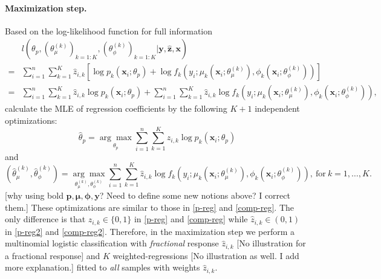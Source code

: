 \documentclass[11pt]{article}
\numberwithin{equation}{section}
\def\bx{\boldsymbol{x}}
\def\by{\boldsymbol{y}}
\def\bp{\boldsymbol{p}}
\def\bmu{\boldsymbol{\mu}}
\def\bphi{\boldsymbol{\phi}}
\def\bz{\boldsymbol{z}}
\begin{document}
\paragraph{Maximization step.}
	Based on the log-likelihood function for full information
	\begin{equation}\label{likelihood}
		\begin{aligned}
			&l\left(\theta_p, (\theta_\mu^{(k)})_{k=1:K}, (\theta_\phi^{(k)})_{k=1:K}|\by,\hat{\bz},\bx\right)\\
			=&\sum_{i=1}^n\sum_{k=1}^K \hat{z}_{i,k}\left[\log p_k(\bx_i;\theta_p) + \log f_k\left(y_i;\mu_k\left(\bx_i;\theta_\mu^{(k)}\right),\phi_k\left(\bx_i;\theta_\phi^{(k)}\right)\right)\right]\\
			=&\sum_{i=1}^n\sum_{k=1}^K \hat{z}_{i,k}\log p_k(\bx_i;\theta_p) + \sum_{i=1}^n\sum_{k=1}^K \hat{z}_{i,k}\log f_k\left(y_i;\mu_k\left(\bx_i;\theta_\mu^{(k)}\right),\phi_k\left(\bx_i;\theta_\phi^{(k)}\right)\right),
		\end{aligned}
	\end{equation}
 calculate the MLE of regression coefficients by the following $K+1$ independent optimizations:
 	\begin{equation}\label{p-reg2}
 	\hat{\theta}_p=\underset{\theta_p}{\arg\max}\sum_{i=1}^n\sum_{k=1}^K\hat{z}_{i,k}\log p_k(\bx_i;\theta_p)
 \end{equation}
 and
 \begin{equation}\label{comp-reg2}
 	\left(\hat{\theta}_\mu^{(k)},\hat{\theta}_\phi^{(k)}\right)=\underset{\theta^{(k)}_\mu,\theta^{(k)}_\phi}{\arg\max}\sum_{i=1}^n\sum_{k=1}^K\hat{z}_{i,k}\log f_k\left(y_i;\mu_k\left(\bx_i;\theta_\mu^{(k)}\right),\phi_k\left(\bx_i;\theta_\phi^{(k)}\right)\right), ~\text{for} ~ k=1,\ldots,K.
 \end{equation}
{\color{blue}[why using bold $\bp,\bmu,\bphi,\by$? Need to define some new notions above? I correct them.]} These optimizations are similar to those in \eqref{p-reg} and \eqref{comp-reg}. 
The only difference is that ${z}_{i,k}\in\{0,1\}$ in \eqref{p-reg} and \eqref{comp-reg} while $\hat{z}_{i,k}\in(0,1)$ in  \eqref{p-reg2} and \eqref{comp-reg2}.
Therefore, in the maximization step we perform a multinomial logistic classification with {\it fractional} response $\hat{z}_{i,k}$ {\color{blue}[No illustration for a fractional response]} and $K$ {weighted}-regressions {\color{blue}[No illustration as well. I add more explanation.]} fitted to {\it all} samples with weights $\hat{z}_{i,k}$.
\end{document}
